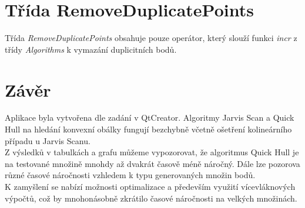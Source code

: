 \documentclass{article}
\begin{document}
\section{Třída RemoveDuplicatePoints}
Třída \emph{RemoveDuplicatePoints} obsahuje pouze operátor, který slouží funkci \emph{incr} z třídy \emph{Algorithms} k vymazání duplicitních bodů.
\newpage
\section{Závěr}
Aplikace byla vytvořena dle zadání v QtCreator. Algoritmy Jarvis Scan a Quick Hull na hledání konvexní obálky fungují bezchybně včetně ošetření kolineárního případu u Jarvis Scanu. \\

Z výsledků v tabulkách a grafu můžeme vypozorovat, že algoritmus Quick Hull je na testované množině mnohdy až dvakrát časově méně náročný. Dále lze pozorova různé časové náročnosti vzhledem k typu generovaných množin bodů.\\

K zamyšlení se nabízí možnosti optimalizace a především využití vícevláknových výpočtů, což by mnohonásobně zkrátilo časové náročnosti na velkých množinách.



%
%

\end{document}
